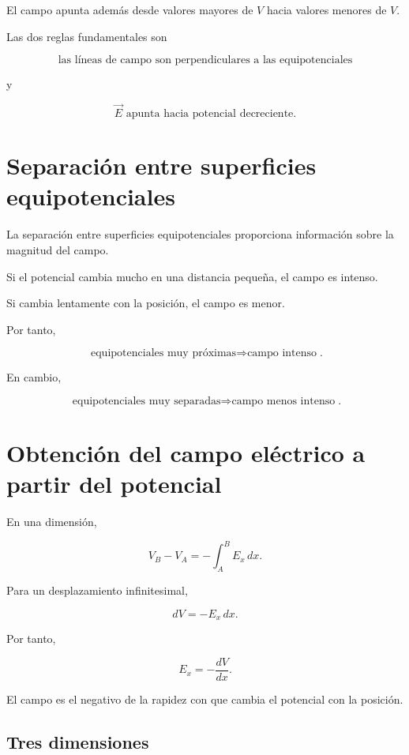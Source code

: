 El campo apunta además desde valores mayores de \(V\) hacia valores menores de \(V\).


\begin{idea}

Las dos reglas fundamentales son

\[
\boxed{
\text{las líneas de campo son perpendiculares a las equipotenciales}
}
\]

y

\[
\boxed{
\vec E\text{ apunta hacia potencial decreciente}
}.
\]

\end{idea}


\section{Separación entre superficies equipotenciales}

La separación entre superficies equipotenciales proporciona información sobre la
magnitud del campo.

Si el potencial cambia mucho en una distancia pequeña, el campo es intenso.

Si cambia lentamente con la posición, el campo es menor.

Por tanto,

\[
\boxed{
\text{equipotenciales muy próximas}
\Longrightarrow
\text{campo intenso}
}.
\]

En cambio,

\[
\boxed{
\text{equipotenciales muy separadas}
\Longrightarrow
\text{campo menos intenso}
}.
\]


\section{Obtención del campo eléctrico a partir del potencial}

En una dimensión,

\[
V_B-V_A=-\int_A^B E_x\,dx.
\]

Para un desplazamiento infinitesimal,

\[
dV=-E_x\,dx.
\]

Por tanto,

\begin{equation}
\boxed{
E_x=-\frac{dV}{dx}
}.
\end{equation}

El campo es el negativo de la rapidez con que cambia el potencial con la posición.


\subsection{Tres dimensiones}

